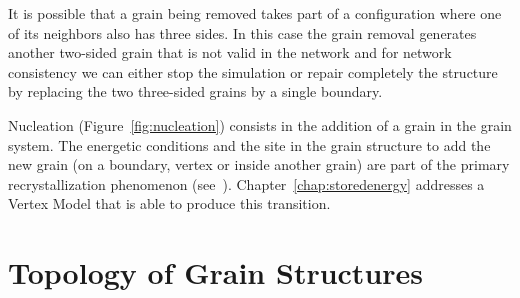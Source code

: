 It is possible that a grain being removed takes part of a configuration where one of its neighbors also has three sides. 
In this case the grain removal generates another two-sided grain that is not valid in the network and for network consistency we can either stop the simulation or repair completely the structure by replacing the two three-sided grains by a single boundary.

Nucleation (Figure~\ref{fig:nucleation}) consists in the addition of a grain in the grain system. The energetic conditions and the site in the grain structure to add the new grain (on a boundary, vertex or inside another grain) are part of the primary recrystallization phenomenon (see~\cite{pikekos2008stochastic, pikekos2008generalized, Piekos2004}). Chapter~\ref{chap:storedenergy} addresses a Vertex Model that is able to produce this transition.



\section{Topology of Grain Structures}


